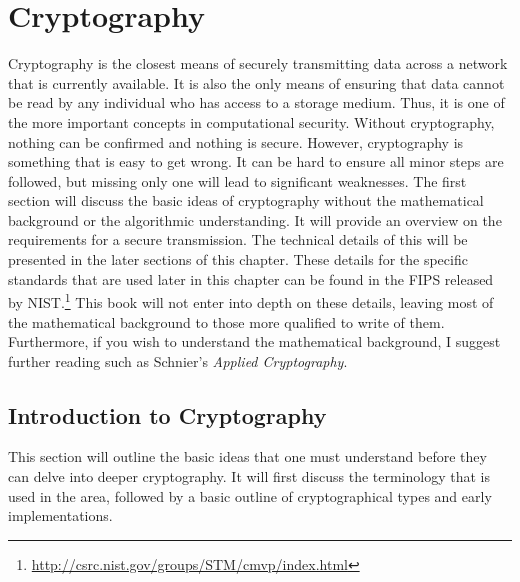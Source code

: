 \chapter{Cryptography}
	\label{ch:Cryptography}
		Cryptography is the closest means of securely transmitting data across a network that is currently available. 
		It is also the only means of ensuring that data cannot be read by any individual who has access to a storage medium. 
		Thus, it is one of the more important concepts in computational security. 
		Without cryptography, nothing can be confirmed and nothing is secure. 
		However, cryptography is something that is easy to get wrong.
		It can be hard to ensure all minor steps are followed, but missing only one will lead to significant weaknesses. 
		The first section will discuss the basic ideas of cryptography without the mathematical background or the algorithmic understanding. 
		It will provide an overview on the requirements for a secure transmission. 
		The technical details of this will be presented in the later sections of this chapter. 
		These details for the specific standards that are used later in this chapter can be found in the FIPS released by NIST.\footnote{\url{http://csrc.nist.gov/groups/STM/cmvp/index.html}}
		This book will not enter into depth on these details, leaving most of the mathematical background to those more qualified to write of them.
		Furthermore, if you wish to understand the mathematical background, I suggest further reading such as Schnier's \textit{Applied Cryptography}\cite{ACrypto}.

	\section{Introduction to Cryptography}
		This section will outline the basic ideas that one must understand before they can delve into deeper cryptography. 
		It will first discuss the terminology that is used in the area, followed by a basic outline of cryptographical types and early implementations. 
